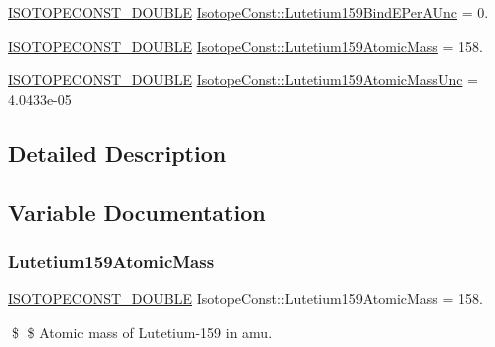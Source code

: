 \begin{DoxyCompactItemize}
\mbox{\hyperlink{group___isotope_const-_macros_ga8f45a7272ce02c0b4c65c44636ed719a}{I\+S\+O\+T\+O\+P\+E\+C\+O\+N\+S\+T\+\_\+\+D\+O\+U\+B\+LE}} \mbox{\hyperlink{group___isotope_const-_lutetium-_lu159_ga54e6fe77926705d48e5cf6223b8674ab}{Isotope\+Const\+::\+Lutetium159\+Bind\+E\+Per\+A\+Unc}} = 0.
\item 
\mbox{\hyperlink{group___isotope_const-_macros_ga8f45a7272ce02c0b4c65c44636ed719a}{I\+S\+O\+T\+O\+P\+E\+C\+O\+N\+S\+T\+\_\+\+D\+O\+U\+B\+LE}} \mbox{\hyperlink{group___isotope_const-_lutetium-_lu159_ga2c7d9b3905ecc41e8829e37302953a81}{Isotope\+Const\+::\+Lutetium159\+Atomic\+Mass}} = 158.
\item 
\mbox{\hyperlink{group___isotope_const-_macros_ga8f45a7272ce02c0b4c65c44636ed719a}{I\+S\+O\+T\+O\+P\+E\+C\+O\+N\+S\+T\+\_\+\+D\+O\+U\+B\+LE}} \mbox{\hyperlink{group___isotope_const-_lutetium-_lu159_ga9503dc99c2addf05e00cb8cc81e5e48f}{Isotope\+Const\+::\+Lutetium159\+Atomic\+Mass\+Unc}} = 4.\+0433e-\/05
\end{DoxyCompactItemize}


\subsection{Detailed Description}


\subsection{Variable Documentation}
\mbox{\label{group___isotope_const-_lutetium-_lu159_ga2c7d9b3905ecc41e8829e37302953a81}} 
\subsubsection{\texorpdfstring{Lutetium159\+Atomic\+Mass}{Lutetium159AtomicMass}}
{\footnotesize\ttfamily \mbox{\hyperlink{group___isotope_const-_macros_ga8f45a7272ce02c0b4c65c44636ed719a}{I\+S\+O\+T\+O\+P\+E\+C\+O\+N\+S\+T\+\_\+\+D\+O\+U\+B\+LE}} Isotope\+Const\+::\+Lutetium159\+Atomic\+Mass = 158.}

\$ \$ Atomic mass of Lutetium-\/159 in amu. \mbox{\label{group___isotope_const-_lutetium-_lu159_ga9503dc99c2addf05e00cb8cc81e5e48f}} 
